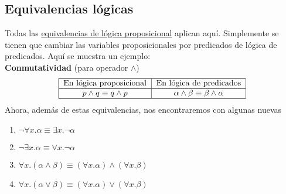 \documentclass{article}
\begin{document}
\subsection{Equivalencias lógicas}
Todas las \hyperref[sec:equiv_logica_util]{equivalencias de lógica proposicional} aplican aquí. Simplemente se tienen que cambiar las variables proposicionales por predicados de lógica de predicados. Aquí se muestra un ejemplo:\\
\textbf{Conmutatividad} (para operador $\wedge$)
\[    
    \begin{tabular}{|c|c|}
        \hline
        En lógica proposicional & En lógica de predicados\\ \hline
        $p \wedge{} q \equiv{} q \wedge{} p$ & $\alpha{} \wedge{} \beta{} \equiv{} \beta{} \wedge{} \alpha{}$ \\ \hline
    \end{tabular}
\]
Ahora, además de estas equivalencias, nos encontraremos con algunas nuevas
\begin{enumerate}
    \item $\neg \forall x . \alpha \equiv \exists x . \neg \alpha$
    \item $\neg \exists x . \alpha \equiv \forall x . \neg \alpha$
    \item $\forall x . (\alpha \wedge \beta) \equiv (\forall x . \alpha) \wedge (\forall x . \beta)$
    \item $\forall x . (\alpha \vee \beta) \equiv (\forall x . \alpha) \vee (\forall x . \beta)$
\end{enumerate}
\end{document}
